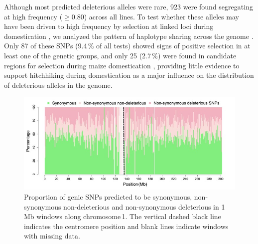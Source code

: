 \documentclass[12pt]{article}
\begin{document}
Although most predicted deleterious alleles were rare, 923 were found segregating at high frequency ($\geq 0.80$) across all lines.  To test whether these alleles may have been driven to high frequency by selection at linked loci during domestication \citep{Lu2006}, we analyzed the pattern of haplotype sharing across the genome \citep[PHS statistics;][]{Toomajian2006}. Only 87 of these SNPs (9.4\,\% of all tests) showed signs of positive selection in at least one of the genetic groups, and only 25 (2.7\,\%) were found in candidate regions for selection during maize domestication \citep{Hufford2012}, providing little evidence to support hitchhiking during domestication as a major influence on the distribution of deleterious alleles in the genome.

\begin{figure}[!t]
  \begin{center}
   \includegraphics[width=140mm]{PerDelGenome_ch1.jpg}
    \caption{Proportion of genic SNPs predicted to be synonymous, non-synonymous non-deleterious and non-synonymous deleterious in 1\,Mb windows along chromosome\,1. The vertical dashed black line indicates the centromere position and blank lines indicate windows with missing data.}
   \label{non_syn_chr1}
  \end{center}
\end{figure}
\end{document}
